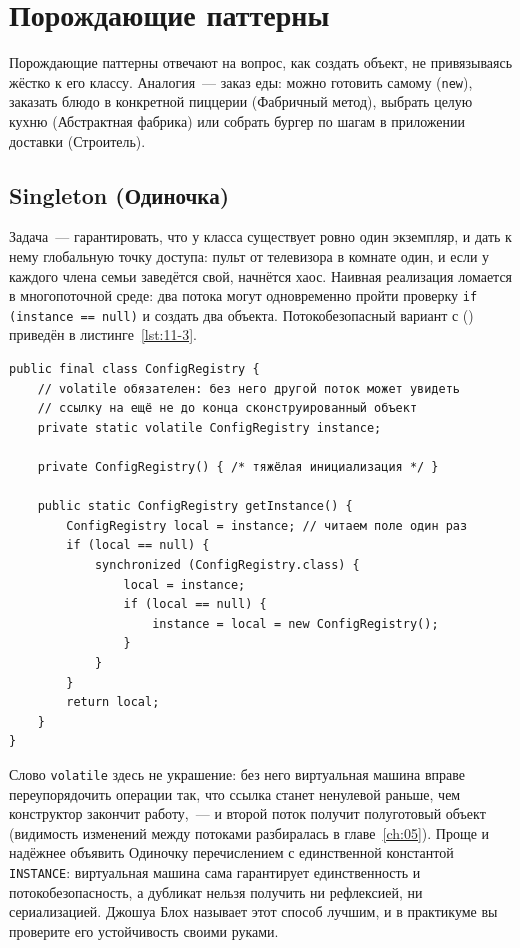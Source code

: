 \section{Порождающие паттерны}

Порождающие паттерны отвечают на вопрос, как создать объект, не привязываясь
жёстко к его классу. Аналогия~--- заказ еды: можно готовить самому
(\texttt{new}), заказать блюдо в конкретной пиццерии (Фабричный метод), выбрать
целую кухню (Абстрактная фабрика) или собрать бургер по шагам в приложении
доставки (Строитель).

\subsection{Singleton (Одиночка)}

Задача~--- гарантировать, что у класса существует ровно один экземпляр, и дать к
нему глобальную точку доступа: пульт от телевизора в комнате один, и если у
каждого члена семьи заведётся свой, начнётся хаос. Наивная реализация ломается в
многопоточной среде: два потока могут одновременно пройти проверку
\texttt{if (instance == null)} и создать два объекта. Потокобезопасный вариант с
 () приведён в
листинге~\ref{lst:11-3}.

\begin{listing}[H]
\begin{verbatim}
public final class ConfigRegistry {
    // volatile обязателен: без него другой поток может увидеть
    // ссылку на ещё не до конца сконструированный объект
    private static volatile ConfigRegistry instance;

    private ConfigRegistry() { /* тяжёлая инициализация */ }

    public static ConfigRegistry getInstance() {
        ConfigRegistry local = instance; // читаем поле один раз
        if (local == null) {
            synchronized (ConfigRegistry.class) {
                local = instance;
                if (local == null) {
                    instance = local = new ConfigRegistry();
                }
            }
        }
        return local;
    }
}
\end{verbatim}
\caption{Одиночка с двойной проверкой блокировки}
\label{lst:11-3}
\end{listing}

Слово \texttt{volatile} здесь не украшение: без него виртуальная машина вправе
переупорядочить операции так, что ссылка станет ненулевой раньше, чем
конструктор закончит работу,~--- и второй поток получит полуготовый объект
(видимость изменений между потоками разбиралась в главе~\ref{ch:05}). Проще и
надёжнее объявить Одиночку перечислением с единственной константой
\texttt{INSTANCE}: виртуальная машина сама гарантирует единственность и
потокобезопасность, а дубликат нельзя получить ни рефлексией, ни сериализацией.
Джошуа Блох называет этот способ лучшим, и в практикуме вы проверите его
устойчивость своими руками.

